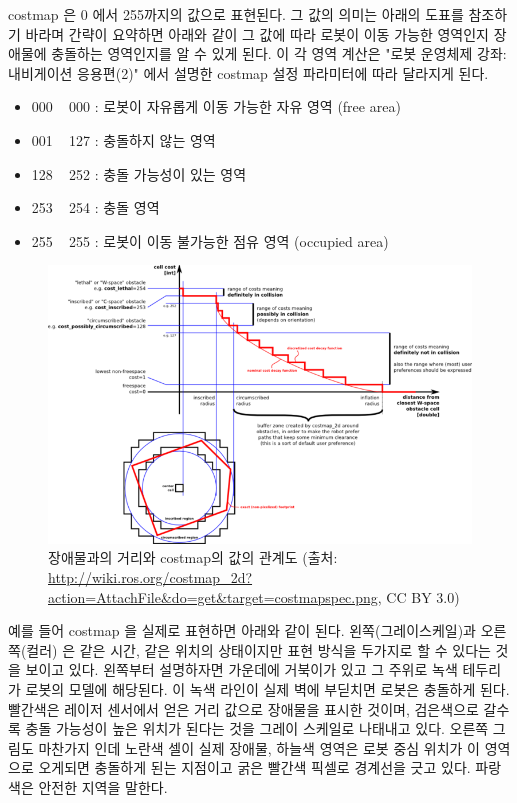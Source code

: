 costmap 은 0 에서 255까지의 값으로 표현된다. 그 값의 의미는 아래의 도표를 참조하기 바라며 간략이 요약하면 아래와 같이 그 값에 따라 로봇이 이동 가능한 영역인지 장애물에 충돌하는 영역인지를 알 수 있게 된다. 이 각 영역 계산은 "로봇 운영체제 강좌: 내비게이션 응용편(2)" 에서 설명한 costmap 설정 파라미터에 따라 달라지게 된다.

\begin{itemize}[leftmargin=*]
\item 000 ~ 000 : 로봇이 자유롭게 이동 가능한 자유 영역 (free area)
\item 001 ~ 127 : 충돌하지 않는 영역
\item 128 ~ 252 : 충돌 가능성이 있는 영역
\item 253 ~ 254 : 충돌 영역
\item 255 ~ 255 : 로봇이 이동 불가능한 점유 영역 (occupied area)
\end{itemize}

\begin{figure}[h]
\centering
\includegraphics[width=\columnwidth]{pictures/chapter11/costmap_calculation.png}
\caption{장애물과의 거리와 costmap의 값의 관계도 (출처: \url{http://wiki.ros.org/costmap_2d?action=AttachFile&do=get&target=costmapspec.png}, CC BY 3.0)}
\end{figure}


예를 들어 costmap 을 실제로 표현하면 아래와 같이 된다. 왼쪽(그레이스케일)과 오른쪽(컬러) 은 같은 시간, 같은 위치의 상태이지만 표현 방식을 두가지로 할 수 있다는 것을 보이고 있다. 왼쪽부터 설명하자면 가운데에 거북이가 있고 그 주위로 녹색 테두리가 로봇의 모델에 해당된다. 이 녹색 라인이 실제 벽에 부딛치면 로봇은 충돌하게 된다. 빨간색은 레이저 센서에서 얻은 거리 값으로 장애물을 표시한 것이며, 검은색으로 갈수록 충돌 가능성이 높은 위치가 된다는 것을 그레이 스케일로 나태내고 있다. 오른쪽 그림도 마찬가지 인데 노란색 셀이 실제 장애물, 하늘색 영역은 로봇 중심 위치가 이 영역으로 오게되면 충돌하게 된는 지점이고 굵은 빨간색 픽셀로 경계선을 긋고 있다. 파랑색은 안전한 지역을 말한다.

